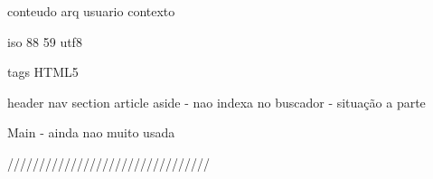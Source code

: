 conteudo  arq  usuario
contexto

iso 88 59
utf8


tags HTML5

header
nav 
section
article
aside - nao indexa no buscador - situação a parte

Main - ainda nao muito usada

////////////////////////////////

